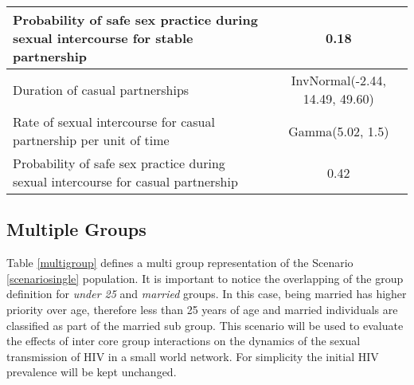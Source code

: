 \begin{longtable}[c]{|p{9cm}|c|}
Probability of safe sex practice during sexual intercourse for stable partnership & 0.18 \\\hline\hline
Duration of casual  partnerships                                                  & InvNormal(-2.44, 14.49, 49.60) \\\hline
Rate of sexual intercourse for casual partnership per unit of time                & Gamma(5.02, 1.5) \\\hline
Probability of safe sex practice during sexual intercourse for casual partnership & 0.42 \\\hline
\end{longtable}

\subsection{Multiple Groups}\label{scenariomulti}

Table \ref{multigroup} defines a multi group representation of the Scenario
\ref{scenariosingle} population. It is important to notice the overlapping of the group
definition for \emph{under 25} and \emph{married} groups. In this case, being married has
higher priority over age, therefore less than 25 years of age and married individuals are
classified as part of the married sub group. This scenario will be used to evaluate the
effects of inter core group interactions on the dynamics of the sexual transmission of
HIV in a small world network. For simplicity the initial HIV prevalence will be kept
unchanged.

